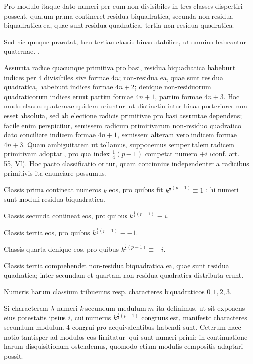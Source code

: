 \documentclass[10pt]{article}
\begin{document}
Pro modulo itaque dato numeri per eum non divisibiles in tres classes dispertiri possent, quarum prima contineret residua biquadratica, secunda non-residua biquadratica ea, quae sunt residua quadratica, tertia non-residua quadratica.

Sed hic quoque praestat, loco tertiae classis binas stabilire, ut omnino habeantur quaternae. .

Assumta radice quacunque primitiva pro basi, residua biquadratica habebunt indices per 4 divisibiles sive formae \(4 n\); non-residua ea, quae sunt residua quadratica, habebunt indices formae \(4 n+2\); denique non-residuorum quadraticorum indices erunt partim formae \(4 n+1\), partim formae \(4 n+3\). Hoc modo classes quaternae quidem oriuntur, at distinctio inter binas posteriores non esset absoluta, sed ab electione radicis primitivae pro basi assumtae dependens; facile enim perspicitur, semissem radicum primitivarum non-residuo quadratico dato conciliare indicem formae \(4 n+1\), semissem alteram vero indicem formae \(4 n+3\). Quam ambiguitatem ut tollamus, supponemus semper talem radicem primitivam adoptari, pro qua index \(\frac{1}{4}(p-1)\) competat numero \(+i\) (conf. art. 55, VI). Hoc pacto classificatio oritur, quam concinnius independenter a radicibus primitivis ita enunciare possumus.

Classis prima contineat numeros \(k\) eos, pro quibus fit \(k^{\frac{1}{2}(p-1)} \equiv 1\) : hi numeri sunt moduli residua biquadratica.

Classis secunda contineat eos, pro quibus \(k^{\frac{1}{4}(p-1)} \equiv i\).

Classis tertia eos, pro quibus \(k^{\frac{1}{2}(p-1)} \equiv-1\).

Classis quarta denique eos, pro quibus \(k^{\frac{1}{4}(p-1)} \equiv-i\).

Classis tertia comprehendet non-residua biquadratica ea, quae sunt residua quadratica; inter secundam et quartam non-residua quadratica distributa erunt.

Numeris harum classium tribuemus resp. characteres biquadraticos \(0,1,2,3\).

Si characterem \(\lambda\) numeri \(k\) secundum modulum \(m\) ita definimus, ut sit exponens eius potestatis ipsius \(i\), cui numerus \(k^{\frac{1}{2}(p-1)}\) congruus est, manifesto characteres secundum modulum 4 congrui pro aequivalentibus habendi sunt. Ceterum haec notio tantisper ad modulos eos limitatur, qui sunt numeri primi: in continuatione harum disquisitionum ostendemus, quomodo etiam modulis compositis adaptari possit.
\end{document}
